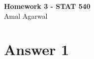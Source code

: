 \documentclass[12pt]{article}
\date{}
\begin{document}

\newtheorem{thm}{Theorem}[section]
\newtheorem{cor}[thm]{Corollary}
\newtheorem{lem}[thm]{Lemma}
\newtheorem{prop}[thm]{Proposition}
\newtheorem{defn}[thm]{Definition}
\newtheorem{exam}[thm]{Example}
\newtheorem{qstn}[thm]{Question}

\newpage
\begin{center}
{\bf Homework 3 - STAT 540}\\
Amal Agarwal
\end{center}
\section*{Answer 1}
\end{document}
